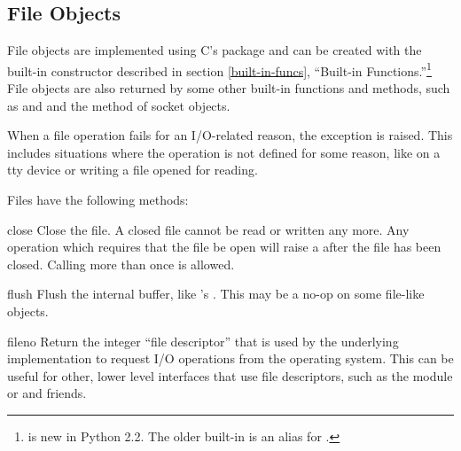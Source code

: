 \subsection{File Objects
            \label{bltin-file-objects}}

File objects are implemented using C's 
package and can be created with the built-in constructor
 described in section
\ref{built-in-funcs}, ``Built-in Functions.''\footnote{
is new in Python 2.2.  The older built-in  is an
alias for .}  File objects are also returned
by some other built-in functions and methods, such as
 and  and the
 method of socket objects.

When a file operation fails for an I/O-related reason, the exception
 is raised.  This includes situations where the
operation is not defined for some reason, like  on a tty
device or writing a file opened for reading.

Files have the following methods:


\begin{methoddesc}[file]{close}{}
  Close the file.  A closed file cannot be read or written any more.
  Any operation which requires that the file be open will raise a
   after the file has been closed.  Calling
   more than once is allowed.
\end{methoddesc}

\begin{methoddesc}[file]{flush}{}
  Flush the internal buffer, like 's
  .  This may be a no-op on some file-like
  objects.
\end{methoddesc}

\begin{methoddesc}[file]{fileno}{}
  Return the integer ``file descriptor'' that is used by the
  underlying implementation to request I/O operations from the
  operating system.  This can be useful for other, lower level
  interfaces that use file descriptors, such as the
   module or
   and friends.  
\end{methoddesc}

